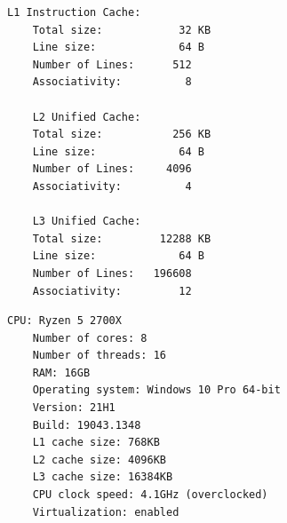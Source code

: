 \documentclass[10pt, titlepage]{extarticle}
\begin{document}
\begin{appendices}
\begin{lstlisting}[caption={Linux Machine System Information},label={lst:sys_info}, style=myStyle]
    L1 Instruction Cache:
    Total size:            32 KB
    Line size:             64 B
    Number of Lines:      512
    Associativity:          8

    L2 Unified Cache:
    Total size:           256 KB
    Line size:             64 B
    Number of Lines:     4096
    Associativity:          4

    L3 Unified Cache:
    Total size:         12288 KB
    Line size:             64 B
    Number of Lines:   196608
    Associativity:         12
\end{lstlisting}

    \begin{lstlisting}[caption={Windows Machine System Information},label={lst:win_sys_info}, style=myStyle]
    CPU: Ryzen 5 2700X
    Number of cores: 8
    Number of threads: 16
    RAM: 16GB
    Operating system: Windows 10 Pro 64-bit
    Version: 21H1
    Build: 19043.1348
    L1 cache size: 768KB
    L2 cache size: 4096KB
    L3 cache size: 16384KB
    CPU clock speed: 4.1GHz (overclocked)
    Virtualization: enabled
\end{lstlisting}


\end{appendices}
\end{document}
